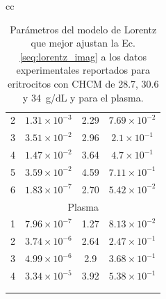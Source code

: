 \begin{table}[h!]
\begin{tabular}{cc}
\begin{minipage}{0.45\textwidth}
\begin{tabular}{cccc}
				2 & $1.31 \times 10^{-3}$ & 2.29 & $7.69 \times 10^{-2}$ \\
				3 & $3.51 \times 10^{-2}$ & 2.96 & $2.1 \times 10^{-1}$ \\
				4 & $1.47 \times 10^{-2}$ & 3.64 & $4.7 \times 10^{-1}$ \\
				5 & $3.59 \times 10^{-2}$ & 4.59 & $7.11 \times 10^{-1}$ \\
				6 & $1.83 \times 10^{-7}$ & 2.70 & $5.42 \times 10^{-2}$ \\
				\hline
				\multicolumn{4}{c}{Plasma} \\
				\hline
				1 & $7.96\times 10^{-7}$ & 1.27 & $8.13\times 10^{-2}$ \\
				2 & $3.74 \times 10^{-6}$ & 2.64 & $2.47 \times 10^{-1}$ \\
				3 & $4.99 \times 10^{-6}$ & 2.9 & $3.68 \times 10^{-1}$ \\
				4 & $3.34 \times 10^{-5}$ & 3.92 & $5.38 \times 10^{-1}$ \\
				 &  &  &  \\
				 &  &  &  \\
				\hline
			\end{tabular}
		\end{minipage}
	\end{tabular}

	\caption{Parámetros del modelo de Lorentz que mejor ajustan la Ec. \ref{seq:lorentz_imag} a los datos experimentales reportados para eritrocitos con CHCM de 28.7, 30.6 y 34~g/dL y para el plasma.}
	\label{table:lorentz15}
\end{table}
%

